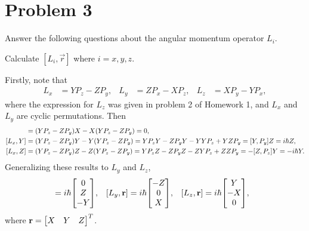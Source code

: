\newcommand{\vr}{\vec{r}}

\newcommand{\Li}{L_i}
\newcommand{\Lx}{L_x}
\newcommand{\Ly}{L_y}
\newcommand{\Lz}{L_z}
\newcommand{\Lw}{L^2}

\newcommand{\Px}{P_x}
\newcommand{\Py}{P_y}
\newcommand{\Pz}{P_z}

\newcommand{\Ri}{R_i}
\newcommand{\Rx}{R_x}
\newcommand{\Ry}{R_y}
\newcommand{\Rz}{R_z}

\newcommand{\Rit}{\Ri(\theta)}
\newcommand{\Rxt}{\Rx(\theta)}
\newcommand{\Ryt}{\Ry(\theta)}
\newcommand{\Rzt}{\Rz(\theta)}

\newcommand{\cost}{\cos{\theta}}
\newcommand{\sint}{\sin{\theta}}

\newcommand{\Mi}{M_i}
\newcommand{\Mx}{M_x}
\newcommand{\My}{M_y}
\newcommand{\Mz}{M_z}

\newcommand{\Jpm}{J_\pm}
\newcommand{\Jp}{J_+}
\newcommand{\Jm}{J_-}

\newcommand{\veps}{\varepsilon}
\newcommand{\hbsqt}{\frac{\hbar}{\sqrt{2}}}

\section{Problem 3}
\begin{statement}
	Answer the following questions about the angular momentum operator $\Li$.
\end{statement}

\begin{problem}
	Calculate $[\Li, \vr]$ where $i = x, y, z$.
\end{problem}

\begin{solution}
	Firstly, note that
	\begin{align*}
		\Lx &= Y \Pz - Z \Py, &
		\Ly &= Z \Px - X \Pz, &
		\Lz &= X \Py - Y \Px,
	\end{align*}
	where the expression for $\Lz$ was given in problem 2 of Homework 1, and $\Lx$ and $\Ly$ are cyclic permutations.  Then
	\begin{align*}
		[\Lx, X] &= (Y \Pz - Z \Py) X - X (Y \Pz - Z \Py) = 0, \\
		[\Lx, Y] &= (Y \Pz - Z \Py) Y - Y (Y \Pz - Z \Py) = Y \Pz Y - Z \Py Y - Y Y \Pz + Y Z \Py = [Y, \Py] Z = \ihb Z, \\
		[\Lx, Z] &= (Y \Pz - Z \Py) Z - Z (Y \Pz - Z \Py) = Y \Pz Z - Z \Py Z - Z Y \Pz + Z Z \Py = -[Z, \Pz] Y = -\ihb Y.
	\end{align*}
	Generalizing these results to $\Ly$ and $\Lz$,
	\begin{align*}
		[\Lx, \vr] &= \ihb \mqty[ 0 \\ Z \\ -Y ], &
		[\Ly, \vr] &= \ihb \mqty[ -Z \\ 0 \\ X ], &
		[\Lz, \vr] &= \ihb \mqty[ Y \\ -X \\ 0 ],
	\end{align*}
	where $\vr = \mqty[X & Y & Z]^T$.
\end{solution}

